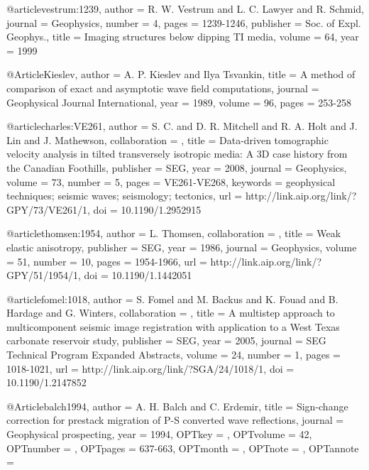 @article{vestrum:1239,
  author =	 {R. W. Vestrum and L. C. Lawyer and R. Schmid},
  journal =	 {Geophysics},
  number =	 4,
  pages =	 {1239-1246},
  publisher =	 {Soc. of Expl. Geophys.},
  title =	 {Imaging structures below dipping {TI} media},
  volume =	 64,
  year =	 1999
}

@Article{Kieslev,
  author =	 {A. P. Kieslev and Ilya Tsvankin},
  title =	 {A method of comparison of exact and asymptotic wave
                  field computations},
  journal =	 {Geophysical Journal International},
  year =	 1989,
  volume =	 96,
  pages =	 {253-258}
}

@article{charles:VE261,
author = {S. C. and D. R. Mitchell and R. A. Holt and
                  J. Lin and J. Mathewson},
collaboration = {},
title = {Data-driven tomographic velocity analysis in tilted
                  transversely isotropic media: A 3{D}  case history from
                  the Canadian Foothills},
publisher = {SEG},
year = {2008},
journal = {Geophysics},
volume = {73},
number = {5},
pages = {VE261-VE268},
keywords = {geophysical techniques; seismic waves; seismology; tectonics},
url = {http://link.aip.org/link/?GPY/73/VE261/1},
doi = {10.1190/1.2952915}
}



@article{thomsen:1954,
author = {L. Thomsen},
collaboration = {},
title = {Weak elastic anisotropy},
publisher = {SEG},
year = {1986},
journal = {Geophysics},
volume = {51},
number = {10},
pages = {1954-1966},
url = {http://link.aip.org/link/?GPY/51/1954/1},
doi = {10.1190/1.1442051}
}


@article{fomel:1018,
author = {S. Fomel and M. Backus and K. Fouad and B. Hardage and G. Winters},
collaboration = {},
title = {A multistep approach to multicomponent seismic image
                  registration with application to a {W}est {T}exas
                  carbonate reservoir study},
publisher = {SEG},
year = {2005},
journal = {SEG Technical Program Expanded Abstracts},
volume = {24},
number = {1},
pages = {1018-1021},
url = {http://link.aip.org/link/?SGA/24/1018/1},
doi = {10.1190/1.2147852}
}




@Article{balch1994,
  author = 	 {A. H. Balch and C. Erdemir},
  title = 	 {Sign-change correction for prestack migration of P-S
                  converted wave reflections},
  journal = 	 {Geophysical prospecting},
  year = 	 {1994},
  OPTkey = 	 {},
  OPTvolume = 	 {42},
  OPTnumber = 	 {},
  OPTpages = 	 {637-663},
  OPTmonth = 	 {},
  OPTnote = 	 {},
  OPTannote = 	 {}
}


